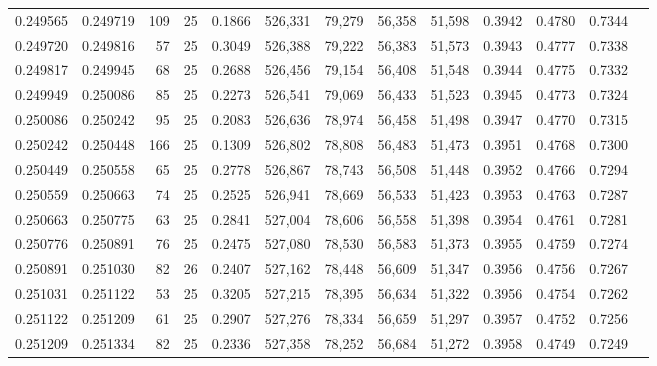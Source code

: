 \begin{tabular}{rrrrrrrrrrrrr}
0.249565 & 0.249719 &   109 &  25 &                                     0.1866 & 526,331 &  79,279 &  56,358 &  51,598 & 0.3942 & 0.4780 & 0.7344 \\
0.249720 & 0.249816 &    57 &  25 &                                     0.3049 & 526,388 &  79,222 &  56,383 &  51,573 & 0.3943 & 0.4777 & 0.7338 \\
0.249817 & 0.249945 &    68 &  25 &                                     0.2688 & 526,456 &  79,154 &  56,408 &  51,548 & 0.3944 & 0.4775 & 0.7332 \\
0.249949 & 0.250086 &    85 &  25 &                                     0.2273 & 526,541 &  79,069 &  56,433 &  51,523 & 0.3945 & 0.4773 & 0.7324 \\
0.250086 & 0.250242 &    95 &  25 &                                     0.2083 & 526,636 &  78,974 &  56,458 &  51,498 & 0.3947 & 0.4770 & 0.7315 \\
0.250242 & 0.250448 &   166 &  25 &                                     0.1309 & 526,802 &  78,808 &  56,483 &  51,473 & 0.3951 & 0.4768 & 0.7300 \\
0.250449 & 0.250558 &    65 &  25 &                                     0.2778 & 526,867 &  78,743 &  56,508 &  51,448 & 0.3952 & 0.4766 & 0.7294 \\
0.250559 & 0.250663 &    74 &  25 &                                     0.2525 & 526,941 &  78,669 &  56,533 &  51,423 & 0.3953 & 0.4763 & 0.7287 \\
0.250663 & 0.250775 &    63 &  25 &                                     0.2841 & 527,004 &  78,606 &  56,558 &  51,398 & 0.3954 & 0.4761 & 0.7281 \\
0.250776 & 0.250891 &    76 &  25 &                                     0.2475 & 527,080 &  78,530 &  56,583 &  51,373 & 0.3955 & 0.4759 & 0.7274 \\
0.250891 & 0.251030 &    82 &  26 &                                     0.2407 & 527,162 &  78,448 &  56,609 &  51,347 & 0.3956 & 0.4756 & 0.7267 \\
0.251031 & 0.251122 &    53 &  25 &                                     0.3205 & 527,215 &  78,395 &  56,634 &  51,322 & 0.3956 & 0.4754 & 0.7262 \\
0.251122 & 0.251209 &    61 &  25 &                                     0.2907 & 527,276 &  78,334 &  56,659 &  51,297 & 0.3957 & 0.4752 & 0.7256 \\
0.251209 & 0.251334 &    82 &  25 &                                     0.2336 & 527,358 &  78,252 &  56,684 &  51,272 & 0.3958 & 0.4749 & 0.7249 \\

\end{tabular}

